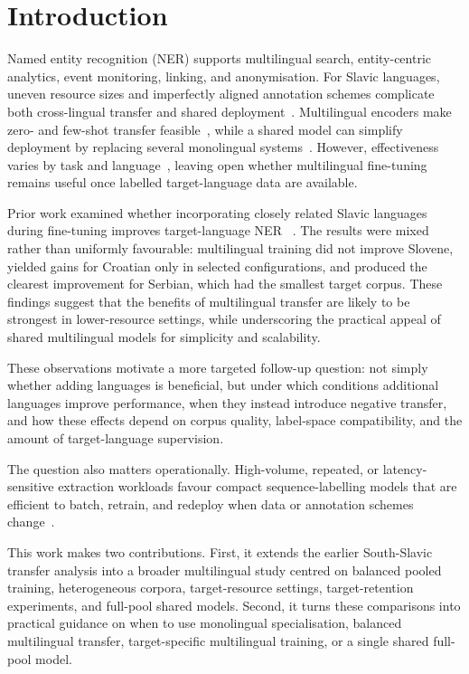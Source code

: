 \documentclass{article}
\begin{document}
\section{Introduction}
Named entity recognition (NER) supports multilingual search, entity-centric analytics, event monitoring, linking, and anonymisation.
For Slavic languages, uneven resource sizes and imperfectly aligned annotation schemes complicate both cross-lingual transfer and shared deployment~\parencite{Strakova2016, piskorski-etal-2024-cross, chaplynskyi-romanyshyn-2024-introducing}.
Multilingual encoders make zero- and few-shot transfer feasible~\parencite{rahimi-etal-2019-massively, pollak-etal-2021-embeddia, pelicon-etal-2021-zero}, while a shared model can simplify deployment by replacing several monolingual systems~\parencite{suppa2021benchmarking, prelevikj-zitnik-2021-multilingual}.
However, effectiveness varies by task and language~\parencite{ulcar2026monocross}, leaving open whether multilingual fine-tuning remains useful once labelled target-language data are available.

Prior work examined whether incorporating closely related Slavic languages during fine-tuning improves target-language NER ~\parencite{ivacic-etal-2023-analysis}. 
The results were mixed rather than uniformly favourable: multilingual training did not improve Slovene, yielded gains for Croatian only in selected configurations, and produced the clearest improvement for Serbian, which had the smallest target corpus. 
These findings suggest that the benefits of multilingual transfer are likely to be strongest in lower-resource settings, while underscoring the practical appeal of shared multilingual models for simplicity and scalability.

These observations motivate a more targeted follow-up question: not simply whether adding languages is beneficial, but under which conditions additional languages improve performance, when they instead introduce negative transfer, and how these effects depend on corpus quality, label-space compatibility, and the amount of target-language supervision.

The question also matters operationally.
High-volume, repeated, or latency-sensitive extraction workloads favour compact sequence-labelling models that are efficient to batch, retrain, and redeploy when data or annotation schemes change~\parencite{ivacic-etal-2025-extreme}.

This work makes two contributions. 
First, it extends the earlier South-Slavic transfer analysis into a broader multilingual study centred on balanced pooled training, heterogeneous corpora, target-resource settings, target-retention experiments, and full-pool shared models. 
Second, it turns these comparisons into practical guidance on when to use monolingual specialisation, balanced multilingual transfer, target-specific multilingual training, or a single shared full-pool model. 
\end{document}
